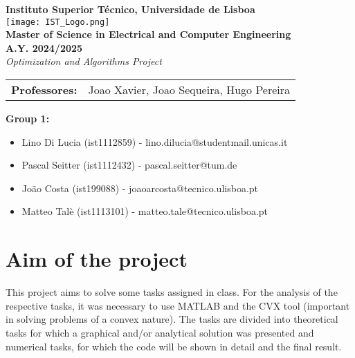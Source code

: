 \documentclass[a4paper,12pt]{report}
\begin{document}
\begin{center}
    \textbf{\LARGE Instituto Superior Técnico, Universidade de Lisboa} \\[1cm]
    \texttt{[image: IST\_Logo.png]} \\[1cm]
    \textbf{\Large Master of Science in Electrical and Computer Engineering} \\[1cm]
    \textbf{\large A.Y. 2024/2025} \\[1cm]
    \textit{\Large Optimization and Algorithms Project} \\[1cm]
\end{center}

\vfill %

\noindent
\begin{tabular}{ll}
    {\large \bfseries Professores:} & {\large  Joao Xavier, Joao Sequeira, Hugo Pereira } 
\end{tabular}

\vfill %

\noindent
\textbf{Group 1:} \\
\begin{itemize}
    \item Lino Di Lucia (ist1112859) - lino.dilucia@studentmail.unicas.it
    \item Pascal Seitter (ist1112432) - pascal.seitter@tum.de
    \item João Costa (ist199088) - joaoarcosta@tecnico.ulisboa.pt
    \item Matteo Talè (ist1113101) - matteo.tale@tecnico.ulisboa.pt
\end{itemize}

\renewcommand{\contentsname}{Index}
\tableofcontents

\newpage %

\pagestyle{aftertoc}

\chapter{Aim of the project}
This project aims to solve some tasks assigned in class. For the analysis of the respective tasks, it was necessary to use MATLAB and the CVX tool (important in solving problems of a convex nature). The tasks are divided into theoretical tasks for which a graphical and/or analytical solution was presented and numerical tasks, for which the code will be shown in detail and the final result.
\end{document}
